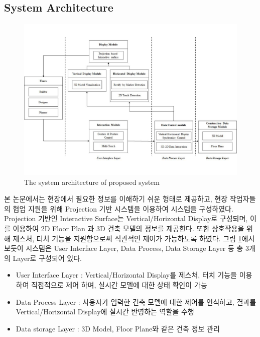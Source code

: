 \subsection{System Architecture}
\begin{figure}[ht!]
    \centering
    \includegraphics[width=\textwidth]{3-System/architecture_}
    \caption{The system architecture of proposed system}
    \label{fig:architecture}
\end{figure}



본 논문에서는 현장에서 필요한 정보를 이해하기 쉬운 형태로 제공하고, 현장 작업자들의 협업 지원을 위해 Projection 기반 시스템을 이용하여 시스템을 구성하였다.  Projection 기반인 Interactive Surface는 Vertical/Horizontal Display로 구성되며, 이를 이용하여 2D Floor Plan 과 3D 건축 모델의 정보를 제공한다. 또한 상호작용을 위해 제스처, 터치 기능을 지원함으로써 직관적인 제어가 가능하도록 하였다. 
그림 \ref{fig:architecture}에서 보듯이 시스템은 User Interface Layer, Data Process, Data Storage Layer 등 총 3개의 Layer로 구성되어 있다. 

\begin{itemize}
\item User Interface Layer : Vertical/Horizontal Display를 제스처, 터치 기능을 이용하여 직접적으로 제어 하며, 실시간 모델에 대한 상태 확인이 가능
\item Data Process Layer : 사용자가 입력한 건축 모델에 대한 제어를 인식하고, 결과를 Vertical/Horizontal Display에 실시간 반영하는 역할을 수행
\item Data storage Layer : 3D Model, Floor Plane와 같은 건축 정보 관리
\end{itemize}



